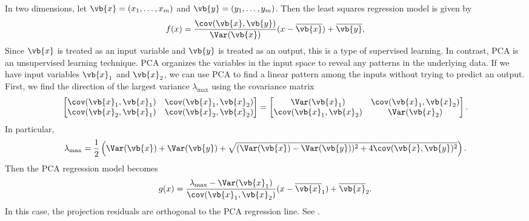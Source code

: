 
In two dimensions, let \(\vb{x} = (x_1, \dots, x_m)\) and \(\vb{y} = (y_1, \dots, y_m)\).
Then the least squares regression model is given by
\begin{equation}
\label{eqn:ols-model}
f(x) = \frac{\cov(\vb{x},\vb{y})}{\Var(\vb{x})}(x - \overline{\vb{x}}) + \overline{\vb{y}},
\end{equation}
Since \(\vb{x}\) is treated as an input variable and \(\vb{y}\) is treated as an output, this is a type of supervised learning.
In contrast, PCA is an unsupervised learning technique.
PCA organizes the variables in the input space to reveal any patterns in the underlying data.
If we have input variables \(\vb{x}_1\) and \(\vb{x}_2\), we can use PCA to find a linear pattern among the inputs without trying to predict an output.
First, we find the direction of the largest variance \(\lambda_{\max}\) using the covariance matrix
\[\begin{bmatrix}
\cov(\vb{x}_1, \vb{x}_1) & \cov(\vb{x}_1, \vb{x}_2) \\
\cov(\vb{x}_2, \vb{x}_1) & \cov(\vb{x}_2, \vb{x}_2)
\end{bmatrix} = \begin{bmatrix}
\Var(\vb{x}_1) & \cov(\vb{x}_1, \vb{x}_2) \\
\cov(\vb{x}_1, \vb{x}_2) & \Var(\vb{x}_2)
\end{bmatrix}.\]
In particular,
\[\lambda_{\max} = \frac{1}{2}\left(\Var(\vb{x}) + \Var(\vb{y}) + \sqrt{(\Var(\vb{x}) - \Var(\vb{y}))^2 + 4\cov(\vb{x},\vb{y})^2}\right).\]
Then the PCA regression model becomes
\begin{equation}
\label{eqn:pca-model}
g(x) = \frac{\lambda_{\max} - \Var({\vb{x}_1})}{\cov(\vb{x}_1,\vb{x}_2)}(x - \overline{\vb{x}}_1) + \overline{\vb{x}}_2.
\end{equation}
In this case, the projection residuals are orthogonal to the PCA regression line.
See .


